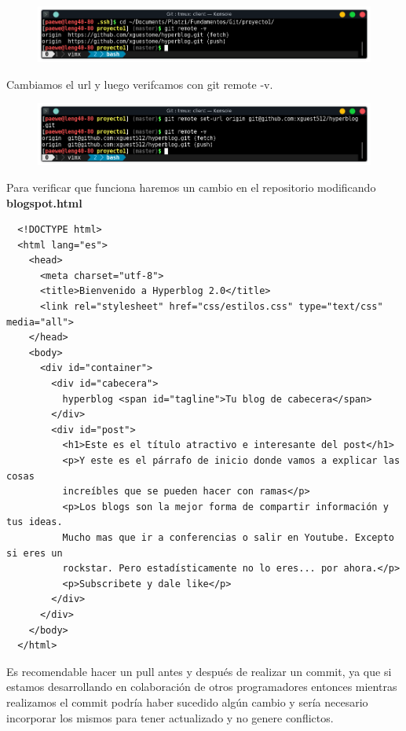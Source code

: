 \documentclass{article}
\begin{document}
\begin{figure}[h!]
  \centering
  \includegraphics[scale=0.75]{./Pictures/229_repo_local.png}
\end{figure}

\newpage

Cambiamos el url y luego verifcamos con git remote -v.

\begin{figure}[h!]
  \centering
  \includegraphics[scale=0.75]{./Pictures/230_remote_update.png}
\end{figure}

Para verificar que funciona haremos un cambio en el repositorio modificando
\textbf{blogspot.html}

\begin{verbatim}
  <!DOCTYPE html>
  <html lang="es">
    <head>
      <meta charset="utf-8">
      <title>Bienvenido a Hyperblog 2.0</title>
      <link rel="stylesheet" href="css/estilos.css" type="text/css" media="all">
    </head>
    <body>
      <div id="container">
        <div id="cabecera">
          hyperblog <span id="tagline">Tu blog de cabecera</span>
        </div>
        <div id="post">
          <h1>Este es el título atractivo e interesante del post</h1>
          <p>Y este es el párrafo de inicio donde vamos a explicar las cosas
          increíbles que se pueden hacer con ramas</p>
          <p>Los blogs son la mejor forma de compartir información y tus ideas.
          Mucho mas que ir a conferencias o salir en Youtube. Excepto si eres un
          rockstar. Pero estadísticamente no lo eres... por ahora.</p>
          <p>Subscribete y dale like</p>
        </div>
      </div>
    </body>
  </html>
\end{verbatim}

Es recomendable hacer un pull antes y después de realizar un commit, ya que si
estamos desarrollando en colaboración de otros programadores entonces mientras
realizamos el commit podría haber sucedido algún cambio y sería necesario
incorporar los mismos para tener actualizado y no genere conflictos.
\end{document}
